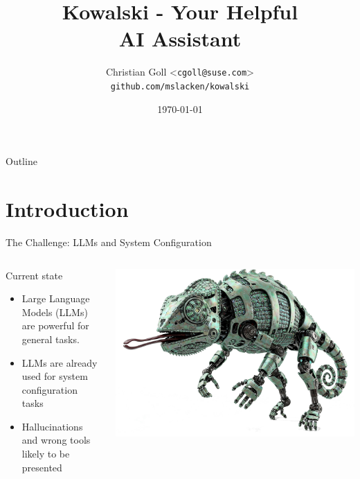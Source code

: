 \documentclass[aspectratio=169]{beamer}
\title{Kowalski - Your Helpful \\AI Assistant}
\author{Christian Goll <\texttt{cgoll@suse.com}>\\\texttt{github.com/mslacken/kowalski}}
\date{\today}
\begin{document}
\begin{frame}
  \titlepage
\end{frame}

\begin{frame}{Outline}
  \tableofcontents
\end{frame}

\section{Introduction}
\begin{frame}[fragile]{The Challenge: LLMs and System Configuration}
\begin{columns}
  \begin{block}{Current state}
    \begin{itemize}
      \item Large Language Models (LLMs) are powerful for general tasks.
      \item LLMs are already used for system configuration tasks
      \item Hallucinations and wrong tools likely to be presented
    \end{itemize}
  \end{block}
  \includegraphics[width=\linewidth]{RobotChameleon}
\end{columns}
\end{frame}
\end{document}

